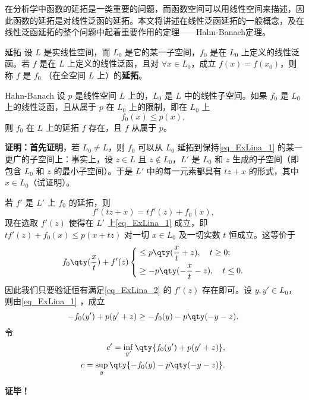 
在分析学中函数的延拓是一类重要的问题，而函数空间可以用线性空间来描述，因此函数的延拓是对线性泛函的延拓。本文将讲述在线性泛函延拓的一般概念，及在线性泛函延拓的整个问题中起着重要作用的定理——Hahn-Banach定理。

\begin{definition}{延拓}
设 $L$ 是实线性空间，而 $L_0$ 是它的某一子空间，$f_0$ 是在 $L_0$ 上定义的线性泛函。若 $f$ 是在 $L$ 上定义的线性泛函，且对 $\forall x\in L_0$，成立 $f(x)=f(x_0)$，则称 $f$ 是 $f_0$ （在全空间 $L$ 上）的\textbf{延拓}。
\end{definition}


\begin{theorem}{Hahn-Banach}
设 $p$ 是线性空间 $L$ 上的，$L_0$ 是 $L$ 中的线性子空间。如果 $f_0$ 是 $L_0$ 上的线性泛函，且从属于 $p$ 在 $L_0$ 上的限制，即在 $L_0$ 上
\begin{equation}\label{eq_ExLina_1}
f_0(x)\leq p(x),~
\end{equation}
则 $f_0$ 在 $L$ 上的延拓 $f$ 存在，且 $f$ 从属于 $p$。
\end{theorem}

\textbf{证明：}\textbf{首先证明}，若 $L_0\neq L$，则 $f_0$ 可以从 $L_0$ 延拓到保持\autoref{eq_ExLina_1} 的某一更广的子空间上：事实上，设 $z\in L$ 且 $z\notin L_0$，$L'$ 是 $L_0$ 和 $z$ 生成的子空间（即包含 $L_0$ 和 $z$ 的最小子空间）。于是 $L'$ 中的每一元素都具有 $tz+x$ 的形式，其中 $x\in L_0$（试证明）。

若 $f'$ 是 $L'$ 上 $f_0$ 的延拓，则
\begin{equation}
f'(tz+x)=tf'(z)+f_0(x),~
\end{equation}
现在选取 $f'(z)$ 使得在 $L'$ 上\autoref{eq_ExLina_1} 成立，即 $tf'(z)+f_0(x)\leq p(x+tz)$ 对一切 $x\in L_0$ 及一切实数 $t$ 恒成立。这等价于
\begin{equation}\label{eq_ExLina_2}
f_0\qty(\frac{x}{t})+f'(z)\left\{\begin{aligned}
&\leq p\qty(\frac{x}{t}+z),\quad t\geq 0;\\
&\geq -p\qty(-\frac{x}{t}-z),\quad t\leq 0.
\end{aligned}\right.
~
\end{equation}
因此我们只要验证恒有满足\autoref{eq_ExLina_2} 的 $f'(z)$ 存在即可。设 $y,y'\in L_0$，则由\autoref{eq_ExLina_1} ，成立
\begin{equation}
-f_0(y')+p(y'+z)\geq -f_0(y)-p\qty(-y-z).~
\end{equation}
 令 
 \begin{equation}
 \begin{aligned}
 c'=\inf_{y'}\qty{f_0(y')+p(y'+z)},\\
 c=\sup_y\qty{-f_0(y)-p\qty(-y-z)}.
 \end{aligned}~
 \end{equation}
 



\textbf{证毕！}



